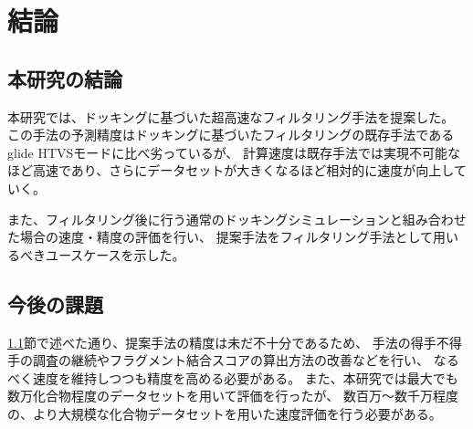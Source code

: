 \chapter{結論}
\section{本研究の結論}\label{sec:conclusion}
本研究では、ドッキングに基づいた超高速なフィルタリング手法を提案した。
この手法の予測精度はドッキングに基づいたフィルタリングの既存手法であるglide HTVSモードに比べ劣っているが、
計算速度は既存手法では実現不可能なほど高速であり、さらにデータセットが大きくなるほど相対的に速度が向上していく。

また、フィルタリング後に行う通常のドッキングシミュレーションと組み合わせた場合の速度・精度の評価を行い、
提案手法をフィルタリング手法として用いるべきユースケースを示した。

\section{今後の課題}
\ref{sec:conclusion}節で述べた通り、提案手法の精度は未だ不十分であるため、
手法の得手不得手の調査の継続やフラグメント結合スコアの算出方法の改善などを行い、
なるべく速度を維持しつつも精度を高める必要がある。
また、本研究では最大でも数万化合物程度のデータセットを用いて評価を行ったが、
数百万～数千万程度の、より大規模な化合物データセットを用いた速度評価を行う必要がある。
